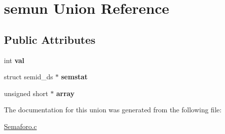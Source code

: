 \hypertarget{unionsemun}{}\section{semun Union Reference}
\label{unionsemun}
\subsection*{Public Attributes}
\begin{DoxyCompactItemize}
\item 
int {\bfseries val}\hypertarget{unionsemun_ac6121ecb6d04a024e07e12bd71b94031}{}\label{unionsemun_ac6121ecb6d04a024e07e12bd71b94031}

\item 
struct semid\+\_\+ds $\ast$ {\bfseries semstat}\hypertarget{unionsemun_afb976847aea44952be2118ad0329d832}{}\label{unionsemun_afb976847aea44952be2118ad0329d832}

\item 
unsigned short $\ast$ {\bfseries array}\hypertarget{unionsemun_aca23b8e730a0553205813c0cb7692b54}{}\label{unionsemun_aca23b8e730a0553205813c0cb7692b54}

\end{DoxyCompactItemize}


The documentation for this union was generated from the following file\+:\begin{DoxyCompactItemize}
\item 
\hyperlink{Semaforo_8c}{Semaforo.\+c}\end{DoxyCompactItemize}
